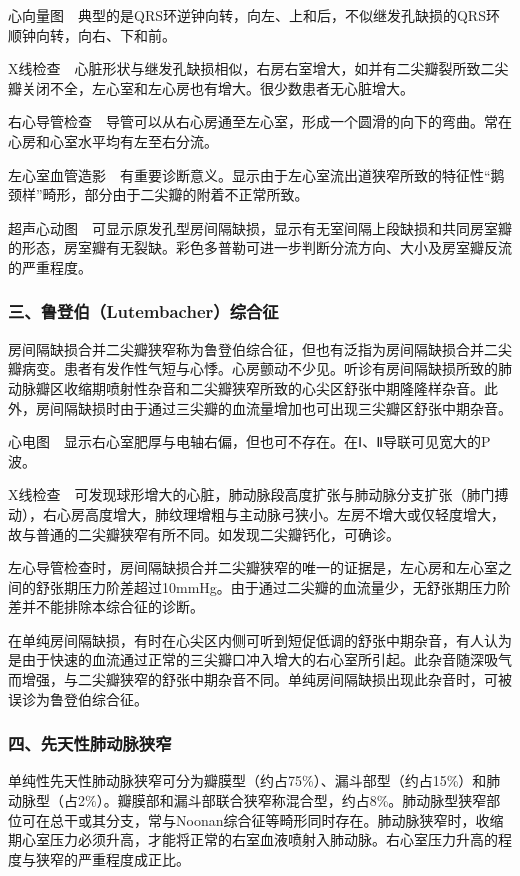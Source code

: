 心向量图　典型的是QRS环逆钟向转，向左、上和后，不似继发孔缺损的QRS环顺钟向转，向右、下和前。

X线检查　心脏形状与继发孔缺损相似，右房右室增大，如并有二尖瓣裂所致二尖瓣关闭不全，左心室和左心房也有增大。很少数患者无心脏增大。

右心导管检查　导管可以从右心房通至左心室，形成一个圆滑的向下的弯曲。常在心房和心室水平均有左至右分流。

左心室血管造影　有重要诊断意义。显示由于左心室流出道狭窄所致的特征性“鹅颈样”畸形，部分由于二尖瓣的附着不正常所致。

超声心动图　可显示原发孔型房间隔缺损，显示有无室间隔上段缺损和共同房室瓣的形态，房室瓣有无裂缺。彩色多普勒可进一步判断分流方向、大小及房室瓣反流的严重程度。

\subsubsection{三、鲁登伯（Lutembacher）综合征}

房间隔缺损合并二尖瓣狭窄称为鲁登伯综合征，但也有泛指为房间隔缺损合并二尖瓣病变。患者有发作性气短与心悸。心房颤动不少见。听诊有房间隔缺损所致的肺动脉瓣区收缩期喷射性杂音和二尖瓣狭窄所致的心尖区舒张中期隆隆样杂音。此外，房间隔缺损时由于通过三尖瓣的血流量增加也可出现三尖瓣区舒张中期杂音。

心电图　显示右心室肥厚与电轴右偏，但也可不存在。在Ⅰ、Ⅱ导联可见宽大的P波。

X线检查　可发现球形增大的心脏，肺动脉段高度扩张与肺动脉分支扩张（肺门搏动），右心房高度增大，肺纹理增粗与主动脉弓狭小。左房不增大或仅轻度增大，故与普通的二尖瓣狭窄有所不同。如发现二尖瓣钙化，可确诊。

左心导管检查时，房间隔缺损合并二尖瓣狭窄的唯一的证据是，左心房和左心室之间的舒张期压力阶差超过10mmHg。由于通过二尖瓣的血流量少，无舒张期压力阶差并不能排除本综合征的诊断。

在单纯房间隔缺损，有时在心尖区内侧可听到短促低调的舒张中期杂音，有人认为是由于快速的血流通过正常的三尖瓣口冲入增大的右心室所引起。此杂音随深吸气而增强，与二尖瓣狭窄的舒张中期杂音不同。单纯房间隔缺损出现此杂音时，可被误诊为鲁登伯综合征。

\subsubsection{四、先天性肺动脉狭窄}

单纯性先天性肺动脉狭窄可分为瓣膜型（约占75\%）、漏斗部型（约占15\%）和肺动脉型（占2\%）。瓣膜部和漏斗部联合狭窄称混合型，约占8\%。肺动脉型狭窄部位可在总干或其分支，常与Noonan综合征等畸形同时存在。肺动脉狭窄时，收缩期心室压力必须升高，才能将正常的右室血液喷射入肺动脉。右心室压力升高的程度与狭窄的严重程度成正比。

